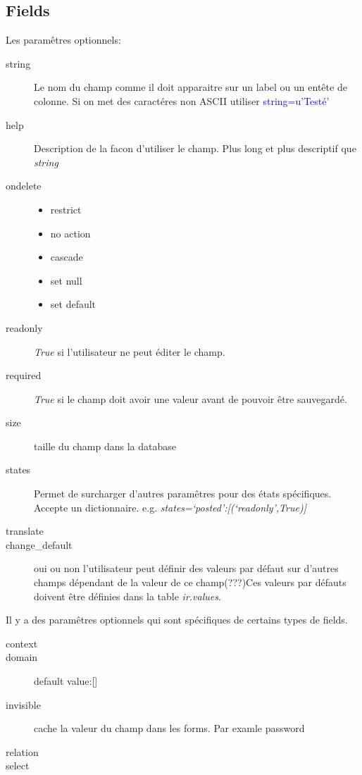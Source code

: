 \documentclass[12pt,a4paper]{article}
\begin{document}
\subsection{Fields}
\label{sec:fields}

Les paramêtres optionnels:
\begin{description}

\item [string] Le nom du champ comme il doit apparaitre sur un label ou un entête de colonne. Si on met des caractéres non ASCII utiliser \textcolor{blue}{string=u'Testé'}
\item[help] Description de la facon d'utiliser le champ. Plus long et plus descriptif que \textsl{string}
\item[ondelete]
  \begin{itemize}
  \item restrict
  \item no action
  \item cascade
  \item set null
  \item set default
  \end{itemize}
\item[readonly] \textsl{True} si l'utilisateur ne peut éditer le champ.
\item[required] \textsl{True} si le champ doit avoir une valeur avant de pouvoir être sauvegardé.
\item[size] taille du champ dans la database
\item[states] Permet de surcharger d'autres paramêtres pour des états spécifiques. Accepte un dictionnaire. e.g. \textit{states={‘posted’:[(‘readonly’,True)]}}
\item[translate]
\item[change\_default] oui ou non l'utilisateur peut définir des valeurs par défaut sur d'autres champs dépendant de la valeur de ce champ(???)Ces valeurs par défauts doivent être définies dans la table \textsl{ir.values}.
\end{description}
Il y a des paramêtres optionnels qui sont spécifiques de certains types de fields.
\begin{description}
\item[context]
\item[domain] default value:[]
\item[invisible] cache la valeur du champ dans les forms. Par examle password
\item[relation]
\item[select] 
\end{description}
\end{document}
